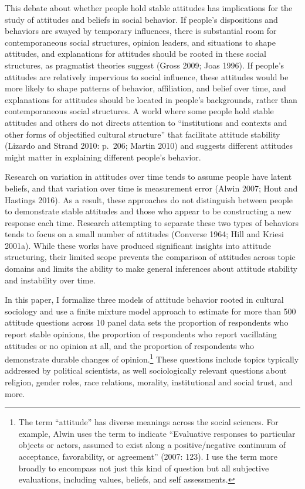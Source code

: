 \documentclass[12pt,]{article}
\begin{document}
This debate about whether people hold stable attitudes has implications for the study of attitudes and beliefs in social behavior. If people's dispositions and behaviors are swayed by temporary influences, there is substantial room for contemporaneous social structures, opinion leaders, and situations to shape attitudes, and explanations for attitudes should be rooted in these social structures, as pragmatist theories suggest (Gross 2009; Joas 1996). If people's attitudes are relatively impervious to social influence, these attitudes would be more likely to shape patterns of behavior, affiliation, and belief over time, and explanations for attitudes should be located in people's backgrounds, rather than contemporaneous social structures. A world where some people hold stable attitudes and others do not directs attention to ``institutions and contexts and other forms of objectified cultural structure'' that facilitate attitude stability (Lizardo and Strand 2010: p.~206; Martin 2010) and suggests different attitudes might matter in explaining different people's behavior.

Research on variation in attitudes over time tends to assume people have latent beliefs, and that variation over time is measurement error (Alwin 2007; Hout and Hastings 2016). As a result, these approaches do not distinguish between people to demonstrate stable attitudes and those who appear to be constructing a new response each time. Research attempting to separate these two types of behaviors tends to focus on a small number of attitudes (Converse 1964; Hill and Kriesi 2001a). While these works have produced significant insights into attitude structuring, their limited scope prevents the comparison of attitudes across topic domains and limits the ability to make general inferences about attitude stability and instability over time.

In this paper, I formalize three models of attitude behavior rooted in cultural sociology and use a finite mixture model approach to estimate for more than 500 attitude questions across 10 panel data sets the proportion of respondents who report stable opinions, the proportion of respondents who report vacillating attitudes or no opinion at all, and the proportion of respondents who demonstrate durable changes of opinion.\footnote{The term ``attitude'' has diverse meanings across the social sciences. For example, Alwin uses the term to indicate ``Evaluative responses to particular objects or actors, assumed to exist along a positive/negative continuum of acceptance, favorability, or agreement'' (2007: 123). I use the term more broadly to encompass not just this kind of question but all subjective evaluations, including values, beliefs, and self assessments.} These questions include topics typically addressed by political scientists, as well sociologically relevant questions about religion, gender roles, race relations, morality, institutional and social trust, and more.
\end{document}
